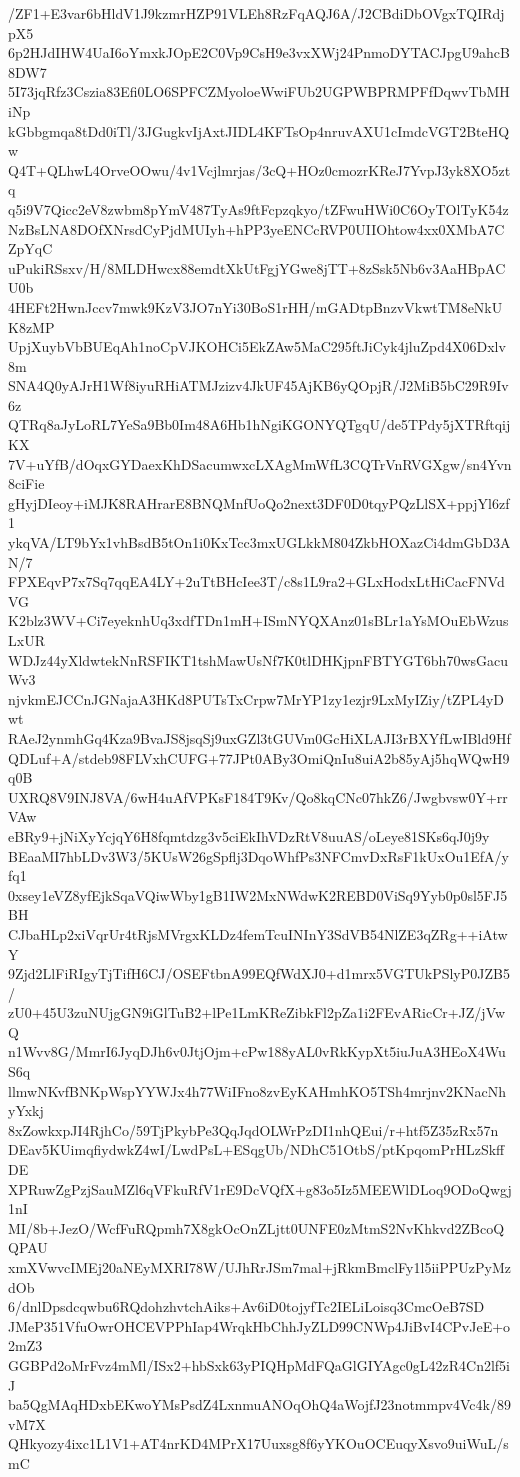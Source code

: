 /ZF1+E3var6bHldV1J9kzmrHZP91VLEh8RzFqAQJ6A/J2CBdiDbOVgxTQIRdjpX5
6p2HJdIHW4UaI6oYmxkJOpE2C0Vp9CsH9e3vxXWj24PnmoDYTACJpgU9ahcB8DW7
5I73jqRfz3Cszia83Efi0LO6SPFCZMyoloeWwiFUb2UGPWBPRMPFfDqwvTbMHiNp
kGbbgmqa8tDd0iTl/3JGugkvIjAxtJIDL4KFTsOp4nruvAXU1cImdcVGT2BteHQw
Q4T+QLhwL4OrveOOwu/4v1Vcjlmrjas/3cQ+HOz0cmozrKReJ7YvpJ3yk8XO5ztq
q5i9V7Qicc2eV8zwbm8pYmV487TyAs9ftFcpzqkyo/tZFwuHWi0C6OyTOlTyK54z
NzBsLNA8DOfXNrsdCyPjdMUIyh+hPP3yeENCcRVP0UIIOhtow4xx0XMbA7CZpYqC
uPukiRSsxv/H/8MLDHwcx88emdtXkUtFgjYGwe8jTT+8zSsk5Nb6v3AaHBpACU0b
4HEFt2HwnJccv7mwk9KzV3JO7nYi30BoS1rHH/mGADtpBnzvVkwtTM8eNkUK8zMP
UpjXuybVbBUEqAh1noCpVJKOHCi5EkZAw5MaC295ftJiCyk4jluZpd4X06Dxlv8m
SNA4Q0yAJrH1Wf8iyuRHiATMJzizv4JkUF45AjKB6yQOpjR/J2MiB5bC29R9Iv6z
QTRq8aJyLoRL7YeSa9Bb0Im48A6Hb1hNgiKGONYQTgqU/de5TPdy5jXTRftqijKX
7V+uYfB/dOqxGYDaexKhDSacumwxcLXAgMmWfL3CQTrVnRVGXgw/sn4Yvn8ciFie
gHyjDIeoy+iMJK8RAHrarE8BNQMnfUoQo2next3DF0D0tqyPQzLlSX+ppjYl6zf1
ykqVA/LT9bYx1vhBsdB5tOn1i0KxTcc3mxUGLkkM804ZkbHOXazCi4dmGbD3AN/7
FPXEqvP7x7Sq7qqEA4LY+2uTtBHcIee3T/c8s1L9ra2+GLxHodxLtHiCacFNVdVG
K2blz3WV+Ci7eyeknhUq3xdfTDn1mH+ISmNYQXAnz01sBLr1aYsMOuEbWzusLxUR
WDJz44yXldwtekNnRSFIKT1tshMawUsNf7K0tlDHKjpnFBTYGT6bh70wsGacuWv3
njvkmEJCCnJGNajaA3HKd8PUTsTxCrpw7MrYP1zy1ezjr9LxMyIZiy/tZPL4yDwt
RAeJ2ynmhGq4Kza9BvaJS8jsqSj9uxGZl3tGUVm0GcHiXLAJI3rBXYfLwIBld9Hf
QDLuf+A/stdeb98FLVxhCUFG+77JPt0ABy3OmiQnIu8uiA2b85yAj5hqWQwH9q0B
UXRQ8V9INJ8VA/6wH4uAfVPKsF184T9Kv/Qo8kqCNc07hkZ6/Jwgbvsw0Y+rrVAw
eBRy9+jNiXyYcjqY6H8fqmtdzg3v5ciEkIhVDzRtV8uuAS/oLeye81SKs6qJ0j9y
BEaaMI7hbLDv3W3/5KUsW26gSpflj3DqoWhfPs3NFCmvDxRsF1kUxOu1EfA/yfq1
0xsey1eVZ8yfEjkSqaVQiwWby1gB1IW2MxNWdwK2REBD0ViSq9Yyb0p0sl5FJ5BH
CJbaHLp2xiVqrUr4tRjsMVrgxKLDz4femTcuINInY3SdVB54NlZE3qZRg++iAtwY
9Zjd2LlFiRIgyTjTifH6CJ/OSEFtbnA99EQfWdXJ0+d1mrx5VGTUkPSlyP0JZB5/
zU0+45U3zuNUjgGN9iGlTuB2+lPe1LmKReZibkFl2pZa1i2FEvARicCr+JZ/jVwQ
n1Wvv8G/MmrI6JyqDJh6v0JtjOjm+cPw188yAL0vRkKypXt5iuJuA3HEoX4WuS6q
llmwNKvfBNKpWspYYWJx4h77WiIFno8zvEyKAHmhKO5TSh4mrjnv2KNacNhyYxkj
8xZowkxpJI4RjhCo/59TjPkybPe3QqJqdOLWrPzDI1nhQEui/r+htf5Z35zRx57n
DEav5KUimqfiydwkZ4wI/LwdPsL+ESqgUb/NDhC51OtbS/ptKpqomPrHLzSkffDE
XPRuwZgPzjSauMZl6qVFkuRfV1rE9DcVQfX+g83o5Iz5MEEWlDLoq9ODoQwgj1nI
MI/8b+JezO/WcfFuRQpmh7X8gkOcOnZLjtt0UNFE0zMtmS2NvKhkvd2ZBcoQQPAU
xmXVwvcIMEj20aNEyMXRI78W/UJhRrJSm7mal+jRkmBmclFy1l5iiPPUzPyMzdOb
6/dnlDpsdcqwbu6RQdohzhvtchAiks+Av6iD0tojyfTc2IELiLoisq3CmcOeB7SD
JMeP351VfuOwrOHCEVPPhIap4WrqkHbChhJyZLD99CNWp4JiBvI4CPvJeE+o2mZ3
GGBPd2oMrFvz4mMl/ISx2+hbSxk63yPIQHpMdFQaGlGIYAgc0gL42zR4Cn2lf5iJ
ba5QgMAqHDxbEKwoYMsPsdZ4LxnmuANOqOhQ4aWojfJ23notmmpv4Vc4k/89vM7X
QHkyozy4ixc1L1V1+AT4nrKD4MPrX17Uuxsg8f6yYKOuOCEuqyXsvo9uiWuL/smC
